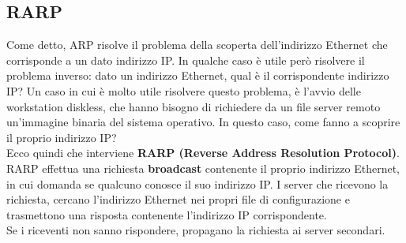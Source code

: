         \subsection{RARP}
        Come detto, ARP risolve il problema della scoperta dell’indirizzo Ethernet che corrisponde a un
        dato indirizzo IP. In qualche caso è utile però risolvere il problema inverso: dato un indirizzo
        Ethernet, qual è il corrispondente indirizzo IP? Un caso in cui è molto utile risolvere questo
        problema, è l’avvio delle workstation diskless, che hanno bisogno di richiedere da un file server
        remoto un’immagine binaria del sistema operativo. In questo caso, come fanno a scoprire il
        proprio indirizzo IP?\\
        
        Ecco quindi che interviene \textbf{RARP (Reverse Address Resolution Protocol)}. RARP effettua una
        richiesta \textbf{broadcast} contenente il proprio indirizzo Ethernet, in cui domanda se qualcuno
        conosce il suo indirizzo IP. I server che ricevono la richiesta, cercano l’indirizzo Ethernet nei
        propri file di configurazione e trasmettono una risposta contenente l’indirizzo IP
        corrispondente.\\

        Se i riceventi non sanno rispondere, propagano la richiesta ai server secondari.
        